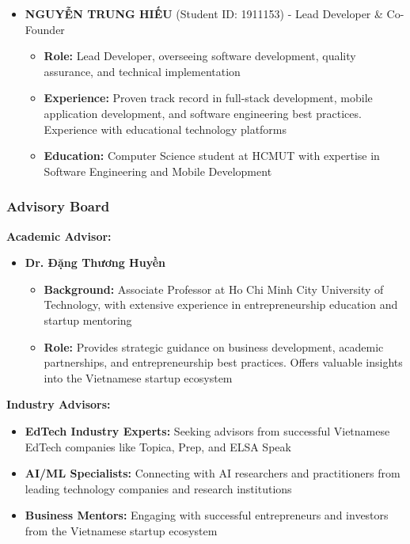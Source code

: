 \begin{itemize}
    \item \textbf{NGUYỄN TRUNG HIẾU} (Student ID: 1911153) - Lead Developer \& Co-Founder
    \begin{itemize}
        \item \textbf{Role:} Lead Developer, overseeing software development, quality assurance, and technical implementation
        \item \textbf{Experience:} Proven track record in full-stack development, mobile application development, and software engineering best practices. Experience with educational technology platforms
        \item \textbf{Education:} Computer Science student at HCMUT with expertise in Software Engineering and Mobile Development
    \end{itemize}
\end{itemize}

\subsubsection{Advisory Board}
\textbf{Academic Advisor:}
\begin{itemize}
    \item \textbf{Dr. Đặng Thương Huyền}
    \begin{itemize}
        \item \textbf{Background:} Associate Professor at Ho Chi Minh City University of Technology, with extensive experience in entrepreneurship education and startup mentoring
        \item \textbf{Role:} Provides strategic guidance on business development, academic partnerships, and entrepreneurship best practices. Offers valuable insights into the Vietnamese startup ecosystem
    \end{itemize}
\end{itemize}

\textbf{Industry Advisors:}
\begin{itemize}
    \item \textbf{EdTech Industry Experts:} Seeking advisors from successful Vietnamese EdTech companies like Topica, Prep, and ELSA Speak
    \item \textbf{AI/ML Specialists:} Connecting with AI researchers and practitioners from leading technology companies and research institutions
    \item \textbf{Business Mentors:} Engaging with successful entrepreneurs and investors from the Vietnamese startup ecosystem
\end{itemize}

